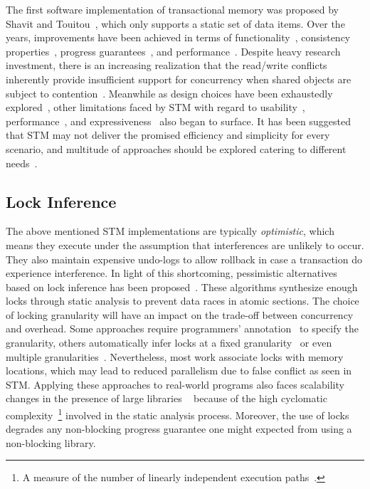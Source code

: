 \documentclass[10pt,conference,compsocconf]{IEEEtran}
\begin{document}
The first software implementation of transactional memory was proposed by Shavit and Touitou~\cite{shavit1997software}, which only supports a static set of data items.
Over the years, improvements have been achieved in terms of functionality~\cite{herlihy2003software}, consistency properties~\cite{guerraoui2008correctness}, progress guarantees~\cite{marathe2006lowering}, and performance~\cite{saha2006mcrt,dice2006transactional}. 
Despite heavy research investment, there is an increasing realization that the read/write conflicts inherently provide insufficient support for concurrency when shared objects are subject to contention~\cite{koskinen2010coarse}.
Meanwhile as design choices have been exhaustedly explored~\cite{marathe2004qualitative,marathe2004design}, other limitations faced by STM with regard to usability~\cite{Rossbach2010transactional}, performance~\cite{cascaval2008software}, and expressiveness~\cite{guerraoui2008obstruction} also began to surface.
It has been suggested that STM may not deliver the promised efficiency and simplicity for every scenario, and multitude of approaches should be explored catering to different needs~\cite{attiya2010inherent}.

\subsection{Lock Inference}
The above mentioned STM implementations are typically \emph{optimistic}, which means they execute under the assumption that interferences are unlikely to occur.
They also maintain expensive undo-logs to allow rollback in case a transaction do experience interference.
In light of this shortcoming, pessimistic alternatives based on lock inference has been proposed~\cite{mccloskey2006autolocker}.
These algorithms synthesize enough locks through static analysis to prevent data races in atomic sections.
The choice of locking granularity will have an impact on the trade-off between concurrency and overhead.
Some approaches require programmers' annotation~\cite{golan2013concurrent} to specify the granularity, others automatically infer locks at a fixed granularity~\cite{emmi2007lock} or even multiple granularities~\cite{cherem2008inferring}.
Nevertheless, most work associate locks with memory locations, which may lead to reduced parallelism due to false conflict as seen in STM. 
Applying these approaches to real-world programs also faces scalability changes in the presence of large libraries ~\cite{gudka2012lock} because of the high cyclomatic complexity~\footnote{A measure of the number of linearly independent execution paths~\cite{mccabe1976complexity}.} involved in the static analysis process.
Moreover, the use of locks degrades any non-blocking progress guarantee one might expected from using a non-blocking library.
\end{document}
